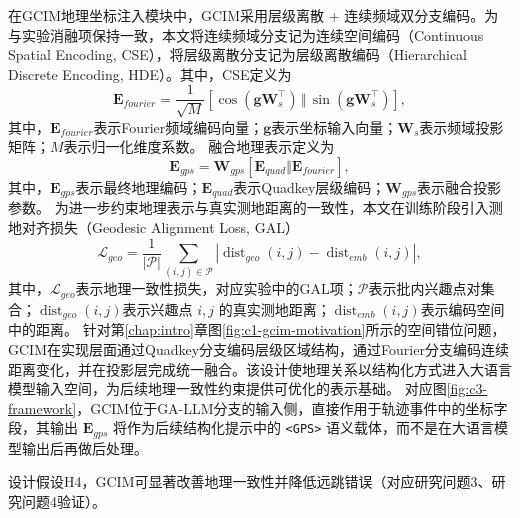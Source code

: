 在GCIM地理坐标注入模块中，GCIM采用层级离散 + 连续频域双分支编码。为与实验消融项保持一致，本文将连续频域分支记为连续空间编码（Continuous Spatial Encoding, CSE），将层级离散分支记为层级离散编码（Hierarchical Discrete Encoding, HDE）。其中，CSE定义为
\begin{equation}
\mathbf{E}_{fourier}=\frac{1}{\sqrt{M}}\left[\cos(\mathbf{g}\mathbf{W}_s^\top)\,\Vert\,\sin(\mathbf{g}\mathbf{W}_s^\top)\right],
\label{eq:c3-fourier}
\end{equation}
其中，$\mathbf{E}_{fourier}$表示Fourier频域编码向量；$\mathbf{g}$表示坐标输入向量；$\mathbf{W}_s$表示频域投影矩阵；$M$表示归一化维度系数。
融合地理表示定义为
\begin{equation}
\mathbf{E}_{gps}=\mathbf{W}_{gps}[\mathbf{E}_{quad}\Vert\mathbf{E}_{fourier}],
\label{eq:c3-egps}
\end{equation}
其中，$\mathbf{E}_{gps}$表示最终地理编码；$\mathbf{E}_{quad}$表示Quadkey层级编码；$\mathbf{W}_{gps}$表示融合投影参数。
为进一步约束地理表示与真实测地距离的一致性，本文在训练阶段引入测地对齐损失（Geodesic Alignment Loss, GAL）
\begin{equation}
\mathcal{L}_{geo}=\frac{1}{|\mathcal{P}|}\sum_{(i,j)\in\mathcal{P}}\left|\operatorname{dist}_{geo}(i,j)-\operatorname{dist}_{emb}(i,j)\right|,
\label{eq:c3-lgeo}
\end{equation}
其中，$\mathcal{L}_{geo}$表示地理一致性损失，对应实验中的GAL项；$\mathcal{P}$表示批内兴趣点对集合；$\operatorname{dist}_{geo}(i,j)$表示兴趣点 $i,j$ 的真实测地距离；$\operatorname{dist}_{emb}(i,j)$表示编码空间中的距离。
针对第\ref{chap:intro}章图\ref{fig:c1-gcim-motivation}所示的空间错位问题，GCIM在实现层面通过Quadkey分支编码层级区域结构，通过Fourier分支编码连续距离变化，并在投影层完成统一融合。该设计使地理关系以结构化方式进入大语言模型输入空间，为后续地理一致性约束提供可优化的表示基础。
对应图\ref{fig:c3-framework}，GCIM位于GA-LLM分支的输入侧，直接作用于轨迹事件中的坐标字段，其输出 $\mathbf{E}_{gps}$ 将作为后续结构化提示中的 \texttt{<GPS>} 语义载体，而不是在大语言模型输出后再做后处理。

{\heiti{}设计假设H4，}GCIM可显著改善地理一致性并降低远跳错误（对应研究问题3、研究问题4验证）。

